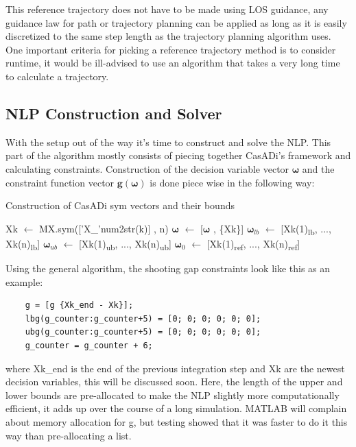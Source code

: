 This reference trajectory does not have to be made using LOS guidance, any guidance law for path or trajectory planning can be applied as long as
it is easily discretized to the same step length as the trajectory planning algorithm uses. One important criteria for picking a reference trajectory 
method is to consider runtime, it would be ill-advised to use an algorithm that takes a very long time to calculate a trajectory.

\subsection{NLP Construction and Solver} 

With the setup out of the way it's time to construct and solve the \gls{NLP}. This part of the algorithm
mostly consists of piecing together CasADi's framework and calculating constraints. Construction of the decision variable vector $\bm{\omega}$ and the constraint function
vector $\textbf{g}(\bm{\omega})$ is done piece wise in the following way:
\begin{algorithm}[ht]
    \caption{Construction of CasADi sym vectors and their bounds} \label{ALG: general CasADi sym}
    \begin{algorithmic}
        \State Xk $\gets$ MX.sym(['X\_'num2str(k)] , n) 
        \State $\bm{\omega}$ $\gets$ [$\bm{\omega}$ , \{Xk\}]
        \State $\bm{\omega}_{lb}$ $\gets$ [Xk(1)\textsubscript{lb}, ..., Xk(n)\textsubscript{lb}]
        \State $\bm{\omega}_{ub}$ $\gets$ [Xk(1)\textsubscript{ub}, ..., Xk(n)\textsubscript{ub}]
        \State $\bm{\omega}_0$ $\gets$ [Xk(1)\textsubscript{ref}, ..., Xk(n)\textsubscript{ref}] 
    \end{algorithmic}
\end{algorithm}

Using the general algorithm, the shooting gap constraints look like this as an example:
\begin{lstlisting}
    g = [g {Xk_end - Xk}];
    lbg(g_counter:g_counter+5) = [0; 0; 0; 0; 0; 0];
    ubg(g_counter:g_counter+5) = [0; 0; 0; 0; 0; 0];
    g_counter = g_counter + 6;
\end{lstlisting}
where Xk\_end is the end of the previous integration step and Xk are the newest decision variables, this will be discussed soon.
Here, the length of the upper and lower bounds are pre-allocated to make the \gls{NLP} slightly more computationally efficient,
it adds up over the course of a long simulation. MATLAB will complain about memory allocation for g, 
but testing showed that it was faster to do it this way than pre-allocating a list. 


